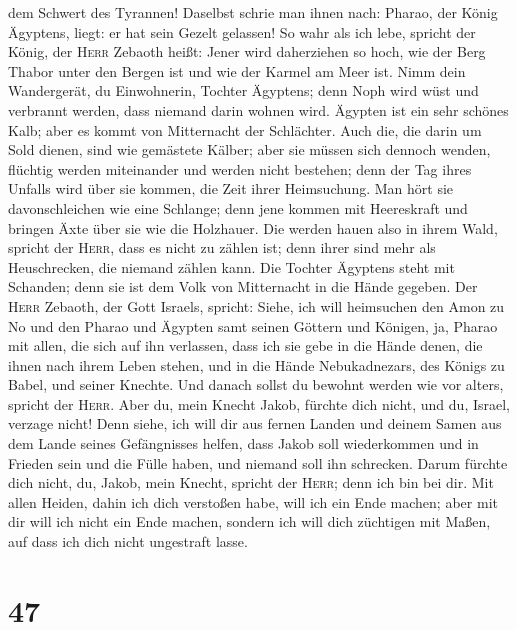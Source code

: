dem Schwert des Tyrannen!  Daselbst schrie man ihnen
nach: Pharao, der König Ägyptens, liegt: er hat sein Gezelt gelassen!
 So wahr als ich lebe, spricht der König, der
\textsc{Herr} Zebaoth heißt: Jener wird daherziehen so hoch, wie der
Berg Thabor unter den Bergen ist und wie der Karmel am Meer ist.
 Nimm dein Wandergerät, du Einwohnerin, Tochter Ägyptens;
denn Noph wird wüst und verbrannt werden, dass niemand darin wohnen
wird.  Ägypten ist ein sehr schönes Kalb; aber es kommt
von Mitternacht der Schlächter.  Auch die, die darin um
Sold dienen, sind wie gemästete Kälber; aber sie müssen sich dennoch
wenden, flüchtig werden miteinander und werden nicht bestehen; denn der
Tag ihres Unfalls wird über sie kommen, die Zeit ihrer Heimsuchung.
 Man hört sie davonschleichen wie eine Schlange; denn
jene kommen mit Heereskraft und bringen Äxte über sie wie die Holzhauer.
 Die werden hauen also in ihrem Wald, spricht der
\textsc{Herr}, dass es nicht zu zählen ist; denn ihrer sind mehr als
Heuschrecken, die niemand zählen kann.  Die Tochter
Ägyptens steht mit Schanden; denn sie ist dem Volk von Mitternacht in
die Hände gegeben.  Der \textsc{Herr} Zebaoth, der Gott
Israels, spricht: Siehe, ich will heimsuchen den Amon zu No und den
Pharao und Ägypten samt seinen Göttern und Königen, ja, Pharao mit
allen, die sich auf ihn verlassen,  dass ich sie gebe in
die Hände denen, die ihnen nach ihrem Leben stehen, und in die Hände
Nebukadnezars, des Königs zu Babel, und seiner Knechte. Und danach
sollst du bewohnt werden wie vor alters, spricht der \textsc{Herr}.
 Aber du, mein Knecht Jakob, fürchte dich nicht, und du,
Israel, verzage nicht! Denn siehe, ich will dir aus fernen Landen und
deinem Samen aus dem Lande seines Gefängnisses helfen, dass Jakob soll
wiederkommen und in Frieden sein und die Fülle haben, und niemand soll
ihn schrecken.  Darum fürchte dich nicht, du, Jakob, mein
Knecht, spricht der \textsc{Herr}; denn ich bin bei dir. Mit allen
Heiden, dahin ich dich verstoßen habe, will ich ein Ende machen; aber
mit dir will ich nicht ein Ende machen, sondern ich will dich züchtigen
mit Maßen, auf dass ich dich nicht ungestraft lasse.

\hypertarget{section-46}{%
\section{47}\label{section-46}}

